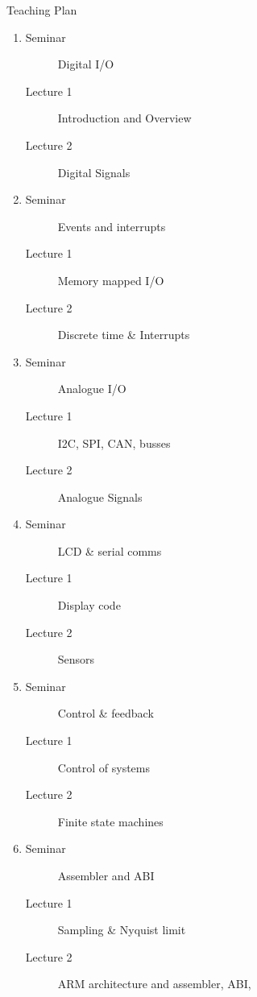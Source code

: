 \documentclass[xcolor=svgnames]{beamer}
\begin{document}
\begin{frame}[allowframebreaks]{Teaching Plan}%
\vspace{-1.1em}\begin{enumerate}[Week 1]
    \item \begin{description}
        \item[Seminar] Digital I/O
        \item[Lecture 1] Introduction and Overview
        \item[Lecture 2] Digital Signals
    \end{description}
    \item  \begin{description}
        \item[Seminar] Events and interrupts
        \item[Lecture 1] Memory mapped I/O
        \item[Lecture 2] Discrete time \& Interrupts
    \end{description}
    \item  \begin{description}
        \item[Seminar] Analogue I/O
        \item[Lecture 1] I2C, SPI, CAN, busses
        \item[Lecture 2] Analogue Signals
    \end{description}
    \item  \begin{description}
        \item[Seminar] LCD \& serial comms
        \item[Lecture 1] Display code
        \item[Lecture 2] Sensors
    \end{description}
    \item  \begin{description}
        \item[Seminar] Control \& feedback
        \item[Lecture 1] Control of systems
        \item[Lecture 2] Finite state machines
    \end{description}
    \item  \begin{description}
        \item[Seminar] Assembler and ABI
        \item[Lecture 1] Sampling \& Nyquist limit
        \item[Lecture 2] ARM architecture and assembler, ABI,

\end{description}
\end{enumerate}
\end{frame}
\end{document}
